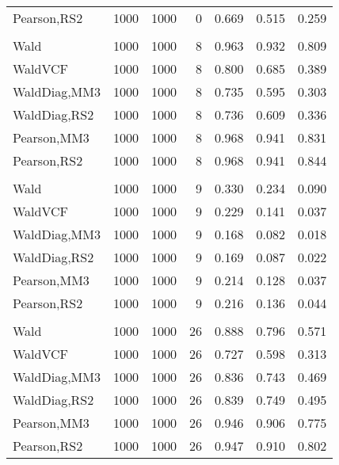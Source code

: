 \documentclass[
]{article}
\begin{document}
\begin{table}[H]
{\begin{tabular}[t]{lrrrrrr}
\hspace{1em}Pearson,RS2 & 1000 & 1000 & 0 & 0.669 & 0.515 & 0.259\\
\addlinespace[0.3em]
\multicolumn{7}{l}{\textbf{1F 15V}}\\
\hspace{1em}Wald & 1000 & 1000 & 8 & 0.963 & 0.932 & 0.809\\
\hspace{1em}WaldVCF & 1000 & 1000 & 8 & 0.800 & 0.685 & 0.389\\
\hspace{1em}WaldDiag,MM3 & 1000 & 1000 & 8 & 0.735 & 0.595 & 0.303\\
\hspace{1em}WaldDiag,RS2 & 1000 & 1000 & 8 & 0.736 & 0.609 & 0.336\\
\hspace{1em}Pearson,MM3 & 1000 & 1000 & 8 & 0.968 & 0.941 & 0.831\\
\hspace{1em}Pearson,RS2 & 1000 & 1000 & 8 & 0.968 & 0.941 & 0.844\\
\addlinespace[0.3em]
\multicolumn{7}{l}{\textbf{2F 10V}}\\
\hspace{1em}Wald & 1000 & 1000 & 9 & 0.330 & 0.234 & 0.090\\
\hspace{1em}WaldVCF & 1000 & 1000 & 9 & 0.229 & 0.141 & 0.037\\
\hspace{1em}WaldDiag,MM3 & 1000 & 1000 & 9 & 0.168 & 0.082 & 0.018\\
\hspace{1em}WaldDiag,RS2 & 1000 & 1000 & 9 & 0.169 & 0.087 & 0.022\\
\hspace{1em}Pearson,MM3 & 1000 & 1000 & 9 & 0.214 & 0.128 & 0.037\\
\hspace{1em}Pearson,RS2 & 1000 & 1000 & 9 & 0.216 & 0.136 & 0.044\\
\addlinespace[0.3em]
\multicolumn{7}{l}{\textbf{3F 15V}}\\
\hspace{1em}Wald & 1000 & 1000 & 26 & 0.888 & 0.796 & 0.571\\
\hspace{1em}WaldVCF & 1000 & 1000 & 26 & 0.727 & 0.598 & 0.313\\
\hspace{1em}WaldDiag,MM3 & 1000 & 1000 & 26 & 0.836 & 0.743 & 0.469\\
\hspace{1em}WaldDiag,RS2 & 1000 & 1000 & 26 & 0.839 & 0.749 & 0.495\\
\hspace{1em}Pearson,MM3 & 1000 & 1000 & 26 & 0.946 & 0.906 & 0.775\\
\hspace{1em}Pearson,RS2 & 1000 & 1000 & 26 & 0.947 & 0.910 & 0.802\\
\bottomrule
\end{tabular}}
\endgroup{}
\end{table}
\end{document}
